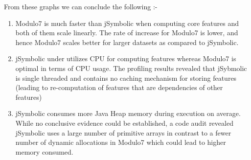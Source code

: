 \newpage

\noindent From these graphs we can conclude the following :-

\begin{enumerate}
\item Modulo7 is much faster than jSymbolic when computing core features and both of them scale linearly. The rate of increase for Modulo7 is lower, and hence Modulo7 scales better for larger datasets as compared to jSymbolic.
\item jSymbolic under utilizes CPU for computing features whereas Modulo7 is optimal in terms of CPU usage. The profiling results revealed that jSybmolic is single threaded and contains no caching mechanism for storing features (leading to re-computation of features that are dependencies of other features)
\item jSymbolic consumes more Java Heap memory during execution on average. While no conclusive evidence could be established, a code audit revealed jSymbolic uses a large number of primitive arrays \cite{jSymbolicCode} in contrast to a fewer number of dynamic allocations in Modulo7 which could lead to higher memory consumed. 
\end{enumerate}


 


